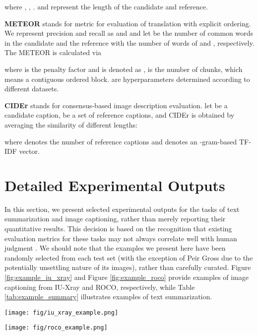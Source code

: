 \documentclass[10pt]{article} \usepackage[preprint]{tmlr}
\begin{document}
where , , .  and  represent the length of the candidate and reference.

\vspace{5pt}
\noindent \textbf{METEOR} stands for metric for evaluation of translation with explicit ordering. We represent precision and recall as  and  and let  be the number of common words in the candidate  and the reference  with the number of words of  and , respectively. The METEOR is calculated via


where  is the penalty factor and is denoted as ,  is the number of chunks, which means a contiguous ordered block.  are hyperparameters determined according to different datasets.

\vspace{5pt}
\noindent \textbf{CIDEr} stands for consensus-based image description evaluation. let  be a candidate caption,  be a set of reference captions, and CIDEr is obtained by averaging the similarity of different lengths:


where  denotes the number of reference captions and  denotes an -gram-based TF-IDF vector.

\section{Detailed Experimental Outputs}
In this section, we present selected experimental outputs for the tasks of text summarization and image captioning, rather than merely reporting their quantitative results. This decision is based on the recognition that existing evaluation metrics for these tasks may not always correlate well with human judgment \citep{kilickaya2017re, cui2018learning}. We should note that the examples we present here have been randomly selected from each test set (with the exception of Peir Gross due to the potentially unsettling nature of its images), rather than carefully curated. Figure \ref{fig:example_iu_xray} and Figure \ref{fig:example_roco} provide examples of image captioning from IU-Xray and ROCO, respectively, while Table \ref{tab:example_summary} illustrates examples of text summarization.

\clearpage
\begin{figure*}
    \centering
    \texttt{[image: fig/iu\_xray\_example.png]}
    \caption{Examples of IU-Xray image captioning using BiomedGPT.}
    \label{fig:example_iu_xray}
\end{figure*}

\clearpage
\begin{figure*}
    \centering
    \texttt{[image: fig/roco\_example.png]}
    \caption{Examples of ROCO image captioning using BiomedGPT.}
    \label{fig:example_roco}
\end{figure*}
\end{document}
